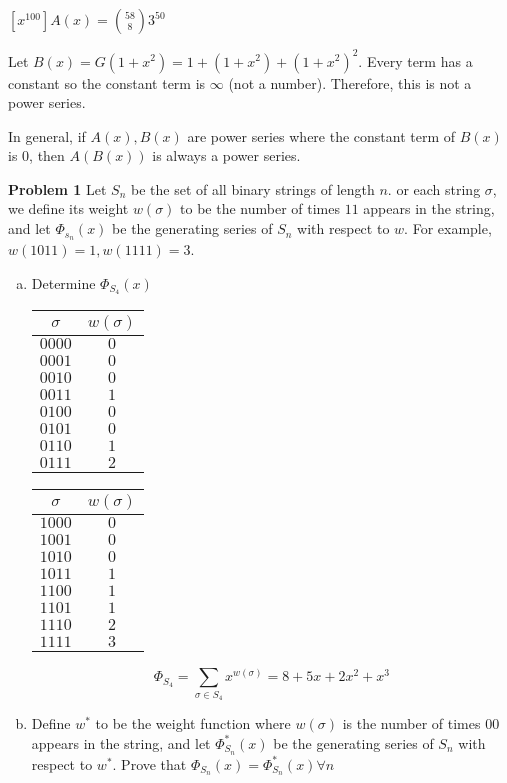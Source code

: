 \documentclass{article}
\begin{document}
$[x^{100}]A(x) = \binom {58}8 3^{50}$

Let $B(x) = G(1+x^2) = 1 + (1+x^2) + (1+x^2)^2$. Every term has a constant so the constant term is $\infty$ (not a number). Therefore, this is not a power series.

In general, if $A(x), B(x)$ are power series where the constant term of $B(x)$ is $0$, then $A(B(x))$ is always a power series.

\textbf{Problem 1}
Let $S_n$ be the set of all binary strings of length $n$. or each string $\sigma$, we define its weight $w(\sigma)$ to be the number of times $11$ appears in the string, and let $\Phi_{s_n}(x)$ be the generating series of $S_n$ with respect to $w$. For example, $w(1011) = 1, w(1111) = 3$.

\begin{enumerate}[a)]
	\item Determine $\Phi_{S_4}(x)$
	
	\begin{tabular}{cc}
		$\sigma$ & $w(\sigma)$ \\ \hline
		$0000$ & $0$  \\ 
		$0001$ & $0$ \\ 
		$0010$ & $0$  \\ 
		$0011$ & $1$  \\ 
		$0100$ & $0$  \\ 
		$0101$ & $0$  \\ 
		$0110$ & $1$  \\ 
		$0111$ & $2$	
		
	\end{tabular}
	\quad
	\begin{tabular}{cc}
		$\sigma$ & $w(\sigma)$ \\ \hline
		$1000$ & $0$  \\ 
		$1001$ & $0$  \\ 
		$1010$ & $0$  \\ 
		$1011$ & $1$  \\ 
		$1100$ & $1$  \\ 
		$1101$ & $1$  \\ 
		$1110$ & $2$  \\ 
		$1111$ & $3$
	\end{tabular}
	
	$$\Phi_{S_4} = \sum_{\sigma \in S_4}x^{w(\sigma)} = 8 + 5x + 2x^2 + x^3$$
	
	\item Define $w^*$ to be the weight function where $w(\sigma)$ is the number of times 00 appears in the string, and let $\Phi_{S_n}^*(x)$  be the generating series of $S_n$ with respect to $w^*$. Prove that $\Phi_{S_n}(x) = \Phi_{S_n}^*(x) \forall n$
	

\end{enumerate}
\end{document}
